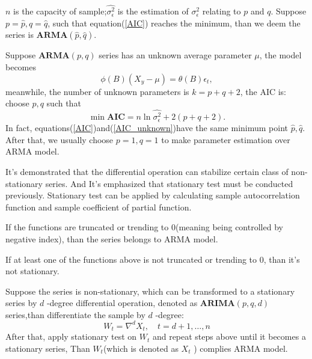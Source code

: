 \documentclass{mcmthesis}
\numberwithin{figure}{section}
\numberwithin{table}{section}
\numberwithin{equation}{section}
\begin{document}
$ n $ is the capacity of sample;$ \hat{\sigma_\epsilon^2} $ is the
estimation of $ \sigma_\epsilon^2 $ relating to $ p $ and $ q $.
Suppose $ p = \hat{p}, q = \hat{q} $, such that equation(\ref{AIC}) reaches the minimum,
than we deem the series is $ \mathbf{ARMA}(\hat{p},\hat{q}) $. 
\par
Suppose $ \mathbf{ARMA}(p,q) $ series has an unknown average parameter $ \mu $,
the model becomes
$$
  \phi(B)(X_y-\mu) = \theta(B)\epsilon_t,
$$   
meanwhile, the number of unknown parameters is $ k = p+q+2 $, the AIC is:
choose $ p,q $ such that
\begin{equation}\label{AIC_unknown}
  \min \mathbf{AIC} = n\ln\hat{\sigma_\epsilon^2}+2(p+q+2).
\end{equation}  
In fact, equations(\ref{AIC})and(\ref{AIC_unknown})have the same minimum point $ \hat{p},\hat{q} $.
After that, we usually choose $ p = 1, q = 1 $ to make parameter estimation 
over ARMA model.
\par
It's demonstrated that the differential operation can stabilize 
certain class of non-stationary series. And It's emphasized that 
stationary test must be conducted previously. Stationary test can 
be applied by calculating sample autocorrelation function and 
sample coefficient of partial function. 
\par
If the functions are truncated or trending to 0(meaning being controlled
by negative index), than the series belongs to ARMA model.
\par
If at least one of the functions above is not truncated or trending to 0, than
it's not stationary.
\par
Suppose the series is non-stationary, which can be transformed to 
a stationary series by $ d $ -degree differential operation, denoted
as $ \mathbf{ARIMA}(p,q,d) $ series,than differentiate the sample by
$ d $ -degree:
$$
  W_t = \nabla^dX_t,\quad t = d+1,\dots , n
$$ 
After that, apply stationary test on $ W_t $ and repeat steps above 
until it becomes a stationary series, Than $ W_t $(which is denoted
as $ X_t $ ) complies ARMA model. 
\end{document}
